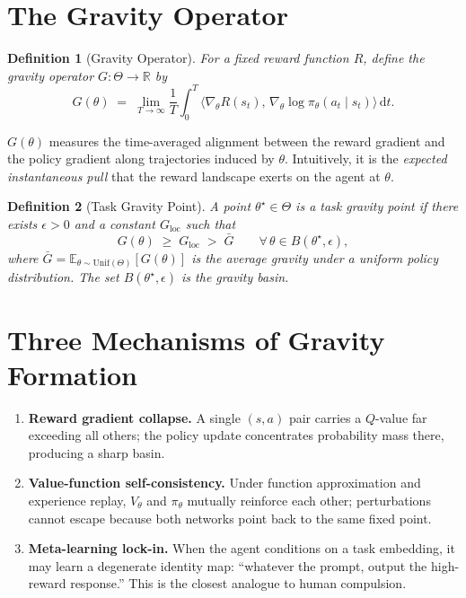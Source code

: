 \documentclass[10pt]{article}
\newtheorem{definition}{Definition}
\begin{document}
\section{The Gravity Operator}

\begin{definition}[Gravity Operator]
For a fixed reward function $R$, define the gravity operator
$G : \Theta \to \mathbb{R}$ by
\begin{equation}\label{eq:gravity}
  G(\theta) \;=\; \lim_{T \to \infty}
  \frac{1}{T}\int_0^T \Big\langle
  \nabla_\theta R(s_t),\,
  \nabla_\theta \log \pi_\theta(a_t \mid s_t)
  \Big\rangle\,\mathrm{d}t.
\end{equation}
\end{definition}

\noindent
$G(\theta)$ measures the time-averaged alignment between the reward
gradient and the policy gradient along trajectories induced by
$\theta$. Intuitively, it is the \emph{expected instantaneous pull}
that the reward landscape exerts on the agent at $\theta$.

\begin{definition}[Task Gravity Point]
A point $\theta^\star \in \Theta$ is a \emph{task gravity point} if
there exists $\epsilon > 0$ and a constant $G_{\mathrm{loc}}$ such that
\[
  G(\theta) \;\geq\; G_{\mathrm{loc}} \;>\; \bar{G}
  \qquad \forall\,\theta \in B(\theta^\star, \epsilon),
\]
where $\bar{G} = \mathbb{E}_{\theta \sim \mathrm{Unif}(\Theta)}[G(\theta)]$
is the average gravity under a uniform policy distribution.
The set $B(\theta^\star, \epsilon)$ is the \emph{gravity basin}.
\end{definition}

\section{Three Mechanisms of Gravity Formation}

\begin{enumerate}
  \item \textbf{Reward gradient collapse.} A single $(s,a)$ pair carries
        a $Q$-value far exceeding all others; the policy update
        concentrates probability mass there, producing a sharp basin.
  \item \textbf{Value-function self-consistency.} Under function
        approximation and experience replay, $V_\theta$ and $\pi_\theta$
        mutually reinforce each other; perturbations cannot escape
        because both networks point back to the same fixed point.
  \item \textbf{Meta-learning lock-in.} When the agent conditions on
        a task embedding, it may learn a degenerate identity map:
        ``whatever the prompt, output the high-reward response.''
        This is the closest analogue to human compulsion.
\end{enumerate}
\end{document}
